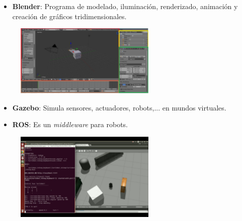 \documentclass[notes,slidesec,a4]{seminar}
\begin{document}
\begin{hslide}
	\begin{itemize}
		\item \textbf{Blender}: Programa de modelado, iluminación, renderizado, animación y creación de gráficos tridimensionales.
	\end{itemize}
	\begin{center}
		\begin{figure}
			\includegraphics[width=0.6\textwidth]{InterfazBlender01.png}
		\end{figure}
	\end{center}
\end{hslide}

\begin{hslide}
	\begin{itemize}
		\item \textbf{Gazebo}: Simula sensores, actuadores, robots,... en mundos virtuales.
		\item \textbf{ROS}: Es un \textit{middleware} para robots.
	\end{itemize}
	\begin{center}
		\begin{figure}
			\includegraphics[width=0.6\textwidth]{ros.png}
		\end{figure}
	\end{center}
\end{hslide}
\end{document}
